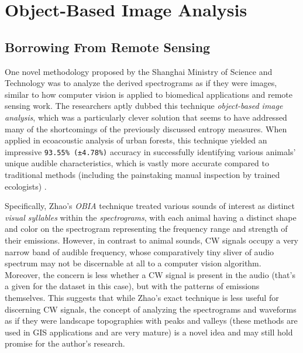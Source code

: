 \documentclass[letterpaper, 12 pt, conference]{ieeeconf}
\begin{document}
\section{Object-Based Image Analysis}
\subsection{Borrowing From Remote Sensing}

    One novel methodology proposed by the Shanghai Ministry of Science and Technology was to analyze the derived spectrograms as if they were images, similar to how computer vision is applied to biomedical applications and remote sensing work. The researchers aptly dubbed this technique \textit{object-based image analysis}, which was a particularly clever solution that seems to have addressed many of the shortcomings of the previously discussed entropy measures. When applied in ecoacoustic analysis of urban forests, this technique yielded an impressive \texttt{93.55\% (±4.78\%)} accuracy in successfully identifying various animals' unique audible characteristics, which is vastly more accurate compared to traditional methods (including the painstaking manual inspection by trained ecologists) \autocite{zhao}.

    Specifically, Zhao's \textit{OBIA} technique treated various sounds of interest as distinct \textit{visual syllables} within the \textit{spectrograms}, with each animal having a distinct shape and color on the spectrogram representing the frequency range and strength of their emissions. However, in contrast to animal sounds, CW signals occupy a very narrow band of audible frequency, whose comparatively tiny sliver of audio spectrum may not be discernable at all to a computer vision algorithm. Moreover, the concern is less whether a CW signal is present in the audio (that's a given for the dataset in this case), but with the patterns of emissions themselves. This suggests that while Zhao's exact technique is less useful for discerning CW signals, the concept of analyzing the spectrograms and waveforms as if they were landscape topographies with peaks and valleys (these methods are used in GIS applications and are very mature) is a novel idea and may still hold promise for the author's research. 
\end{document}
